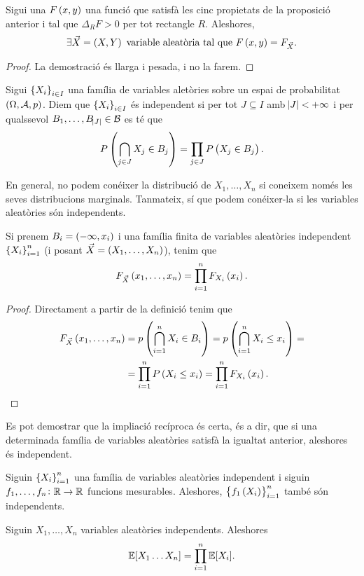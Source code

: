 \begin{prop}
    Sigui una $F\left( x,y\right)$ una funció que satisfà les cinc propietats de la proposició anterior i tal que $\Delta_RF>0$ per tot rectangle $R$. Aleshores,
    \[
        \exists \vec{X}=\left( X,Y\right) \text{ variable aleatòria tal que } F\left( x,y\right) = F_{\vec{X}}.
    \]
\end{prop}
\begin{proof}
    La demostració és llarga i pesada, i no la farem.
\end{proof}
\begin{defi}
    Sigui $\left\{ X_i\right\}_{i\in I}$ una família de variables aletòries sobre un espai de probabilitat $\left(\Omega,\mathcal{A},p\right)$. Diem que $\left\{ X_i\right\}_{i\in I}$ és independent si per tot $J\subseteq I$ amb $\abs{J}<+\infty$ i per qualssevol $B_1,\dots,B_{\abs{J}}\in\mathcal{B}$ es té que
    \[
        P\left(\bigcap_{j\in J}X_j\in B_j\right) = \prod_{j\in J} P\left( X_j\in B_j\right).
    \]
\end{defi}
En general, no podem conéixer la distribució de $X_1,\dots,X_n$ si coneixem només les seves distribucions marginals. Tanmateix, sí que podem conéixer-la si les variables aleatòries són independents.
\begin{prop}
    Si prenem $B_i=\left(-\infty,x_i\right)$ i una família finita de variables aleatòries independent $\left\{ X_i\right\}_{i=1}^n$ (i posant $\vec{X}=\left( X_1,\dots,X_n\right)$), tenim que
    \[
        F_{\vec{X}}\left( x_1,\dots,x_n\right) = \prod_{i=1}^n F_{X_i}\left( x_i\right).
    \]
\end{prop}
\begin{proof}
    Directament a partir de la definició tenim que
    \begin{align*}
        F_{\vec{X}}\left( x_1,\dots,x_n\right) &= p\left( \bigcap_{i=1}^n X_i\in B_i\right) =p\left( \bigcap_{i=1}^n X_i\leq x_i\right) =\\
        &= \prod_{i=1}^n P\left( X_i\leq x_i\right) = \prod_{i=1}^n F_{X_i}\left( x_i\right).
    \end{align*}
\end{proof}
\begin{obs}
    Es pot demostrar que la impliació recíproca és certa, és a dir, que si una determinada família de variables aleatòries satisfà la igualtat anterior, aleshores és independent.
\end{obs}
\begin{obs}
    Siguin $\left\{ X_i\right\}_{i=1}^n$ una família de variables aleatòries independent i siguin $f_1,\dots,f_n\colon \mathbb{R}\to\mathbb{R}$ funcions mesurables. Aleshores, $\left\{ f_1\left( X_i\right)\right\}_{i=1}^n$ també són independents.
\end{obs}
\begin{prop}
    Siguin $X_1, \dots, X_n$ variables aleatòries independents. Aleshores 
    \[
        \operatorname{\mathbb{E}}[X_1\dots X_n] = \prod \limits_{i=1}^n \operatorname{\mathbb{E}}[X_i].
    \]
\end{prop}

